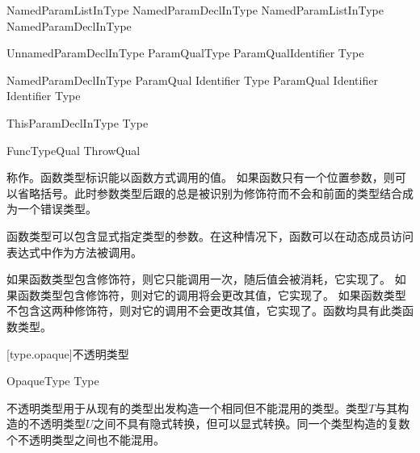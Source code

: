 \begin{bnf}{NamedParamListInType}
    NamedParamDeclInType \br
    NamedParamListInType \terminal{,} NamedParamDeclInType
\end{bnf}

\begin{bnf}{UnnamedParamDeclInType}
    ParamQual\bnfq Type \br
    ParamQual\bnfq Identifier \terminal{:} Type\bnfq
\end{bnf}

\begin{bnf}{NamedParamDeclInType}
    ParamQual\bnfq \terminal{(} Identifier \terminal{)} Type\bnfq
    ParamQual\bnfq \terminal{(} Identifier \terminal{)} Identifier \terminal{:} Type\bnfq
\end{bnf}

\begin{bnf}{ThisParamDeclInType}
     \terminal{:} Type
\end{bnf}

\begin{bnf}{FuncTypeQual}
    ThrowQual \br
     \br
     \br
     \br
\end{bnf}

\pnum
{}称作。函数类型标识能以函数方式调用的值。
如果函数只有一个位置参数，则可以省略括号。此时参数类型后跟的总是被识别为修饰符而不会和前面的类型结合成为一个错误类型。

\pnum
函数类型可以包含显式指定类型的参数。在这种情况下，函数可以在动态成员访问表达式中作为方法被调用。

\pnum
如果函数类型包含修饰符，则它只能调用一次，随后值会被消耗，它实现了。
如果函数类型包含修饰符，则对它的调用将会更改其值，它实现了。
如果函数类型不包含这两种修饰符，则对它的调用不会更改其值，它实现了。函数均具有此类函数类型。

[type.opaque]{不透明类型}

\begin{bnf}{OpaqueType}
     Type
\end{bnf}

\pnum
不透明类型用于从现有的类型出发构造一个相同但不能混用的类型。类型$T$与其构造的不透明类型$U$之间不具有隐式转换，但可以显式转换。同一个类型构造的复数个不透明类型之间也不能混用。

